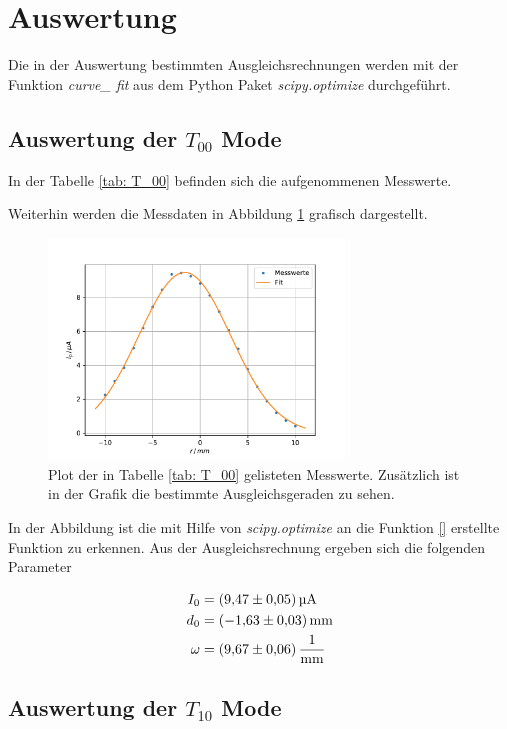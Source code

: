\section{Auswertung}

Die in der Auswertung bestimmten Ausgleichsrechnungen werden mit
der Funktion \emph{curve\_ fit} \cite{scipy} aus dem Python Paket \emph{scipy.optimize}\cite{scipy} durchgeführt.

\subsection{Auswertung der $T_{00}$ Mode}

In der Tabelle \ref{tab: T_00} befinden sich die aufgenommenen Messwerte.

Weiterhin werden die Messdaten in Abbildung \ref{fig: T_00} grafisch dargestellt.
\begin{figure}[h]
  \centering
  \includegraphics[width=0.7\textwidth]{../Messdaten/plots/T_00.pdf}
  \caption{Plot der in Tabelle \ref{tab: T_00} gelisteten Messwerte. Zusätzlich ist in der Grafik die bestimmte Ausgleichsgeraden zu sehen.}
  \label{fig: T_00}
\end{figure}
In der Abbildung ist die mit Hilfe von \emph{scipy.optimize} an die Funktion \eqref{} erstellte Funktion zu erkennen.
Aus der Ausgleichsrechnung ergeben sich die folgenden Parameter

\begin{align*}
  I_0&=\SI{9.47 \pm 0.05}{\micro\ampere}\\
  d_0&=\SI{-1.63\pm 0.03}{\milli\meter}\\
  \omega&=\SI{9.67\pm0.06}{\per\milli\meter}
\end{align*}

\subsection{Auswertung der $T_{10}$ Mode}

